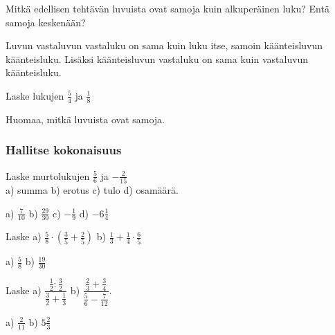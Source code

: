 \begin{tehtavasivu}
\begin{tehtava}
Mitkä edellisen tehtävän luvuista ovat samoja kuin alkuperäinen luku? Entä samoja keskenään?
	\begin{vastaus}
		Luvun vastaluvun vastaluku on sama kuin luku itse, samoin käänteisluvun käänteisluku. Lisäksi käänteisluvun vastaluku on sama kuin vastaluvun käänteisluku. 
	\end{vastaus}
\end{tehtava}

\begin{tehtava}
Laske lukujen $\frac{5}{4}$ ja $\frac{1}{8}$ 
	\begin{alakohdat}
	\end{alakohdat}
Huomaa, mitkä luvuista ovat samoja.
	\begin{vastaus}
		\begin{alakohdat}
			\alakohta{$\frac{-11}{8}$}
			\alakohta{$8\frac{5}{4}=10$}
			\alakohta{$-\frac{11}{8}$}
			\alakohta{$-\frac{8}{11}$}
		\end{alakohdat}
		
	\end{vastaus}
\end{tehtava}

\subsubsection*{Hallitse kokonaisuus}

\begin{tehtava}
Laske murtolukujen $\frac{5}{6}$ ja $-\frac{2}{15}$ \\ a) summa \qquad b) erotus \qquad c) tulo \qquad d) osamäärä.
\begin{vastaus}
a) $\frac{7}{10}$ \qquad b) $\frac{29}{30}$ \qquad c) $-\frac{1}{9}$ \qquad d) $-6\frac{1}{4}$
\end{vastaus}
\end{tehtava}

\begin{tehtava} Laske
a) $\frac{5}{8}\cdot(\frac{3}{5}+\frac{2}{5})$ \qquad b) $\frac{1}{3}+\frac{1}{4}\cdot\frac{6}{5}$
\begin{vastaus}
a) $\frac{5}{8}$ \qquad b) $\frac{19}{30}$
\end{vastaus}
\end{tehtava}

\begin{tehtava}Laske
a) $\dfrac{\frac{1}{2}:\frac{3}{2}}{\frac{3}{2}+\frac{1}{3}}$ \qquad b) $\dfrac{\frac{2}{3}+\frac{3}{4}}{\frac{5}{6}-\frac{7}{12}}$.
\begin{vastaus}
a) $\frac{2}{11}$ \qquad b) $5\frac{2}{3}$
\end{vastaus}
\end{tehtava}


\end{tehtavasivu}
